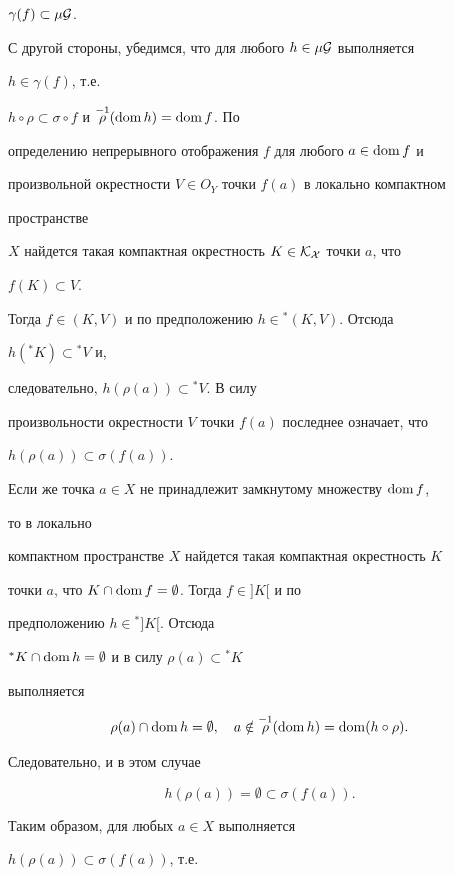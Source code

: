 \begin{pf}
$\gamma(f)\subset\mu\cal G$.





С другой стороны, убедимся, что для любого $h\in\mu\cal G$ выполняется


$h\in\gamma(f)$, т.е.


$h\circ \rho\subset\sigma\circ f$ и $\overset{-1}{\rho}{} (\operatorname{dom} h)=\operatorname{dom} f$. По


определению непрерывного отображения $f$ для любого $a\in\operatorname{dom} f$ и


произвольной окрестности $V\in O_Y$ точки $f(a)$ в локально компактном


пространстве


$X$ найдется такая компактная окрестность $K\in\cal K_X$ точки $a$, что


$f(K)\subset V$.


Тогда $f\in(K,V)$ и по предположению $h\in{}^*(K,V)$. Отсюда


$h({}^*K)\subset{}^*V$ и,


следовательно, $h(\rho(a))\subset{}^*V$. В силу


произвольности окрестности $V$ точки $f(a)$ последнее означает, что


$h(\rho(a))\subset\sigma(f(a))$.


Если же точка $a\in X$ не принадлежит замкнутому множеству $\operatorname{dom} f$,


то в локально


компактном пространстве $X$ найдется такая компактная окрестность $K$


точки $a$, что $K\cap\operatorname{dom} f=\emptyset$. Тогда $f\in]K[$ и по


предположению $h\in{}^*]K[$. Отсюда


${}^*K\cap\operatorname{dom} h=\emptyset$ и в силу $\rho(a)\subset{}^*K$


выполняется


$$


\rho(a)\cap\dom h=\emptyset,\quad


a\notin\mir (\dom h)=\dom(h\circ \rho).


$$


Следовательно, и в этом случае


$$


h(\rho(a))=\emptyset\subset\sigma(f(a)).


$$


Таким образом, для любых $a\in X$ выполняется


$h(\rho(a))\subset\sigma(f(a))$, т.е.



\end{pf}
